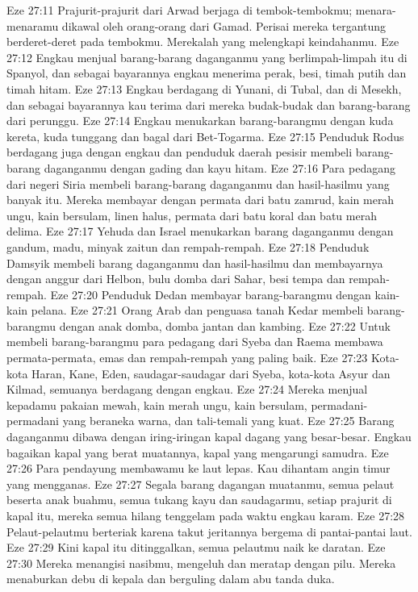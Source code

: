 Eze 27:11  Prajurit-prajurit dari Arwad berjaga di tembok-tembokmu; menara-menaramu dikawal oleh orang-orang dari Gamad. Perisai mereka tergantung berderet-deret pada tembokmu. Merekalah yang melengkapi keindahanmu.
Eze 27:12  Engkau menjual barang-barang daganganmu yang berlimpah-limpah itu di Spanyol, dan sebagai bayarannya engkau menerima perak, besi, timah putih dan timah hitam.
Eze 27:13  Engkau berdagang di Yunani, di Tubal, dan di Mesekh, dan sebagai bayarannya kau terima dari mereka budak-budak dan barang-barang dari perunggu.
Eze 27:14  Engkau menukarkan barang-barangmu dengan kuda kereta, kuda tunggang dan bagal dari Bet-Togarma.
Eze 27:15  Penduduk Rodus berdagang juga dengan engkau dan penduduk daerah pesisir membeli barang-barang daganganmu dengan gading dan kayu hitam.
Eze 27:16  Para pedagang dari negeri Siria membeli barang-barang daganganmu dan hasil-hasilmu yang banyak itu. Mereka membayar dengan permata dari batu zamrud, kain merah ungu, kain bersulam, linen halus, permata dari batu koral dan batu merah delima.
Eze 27:17  Yehuda dan Israel menukarkan barang daganganmu dengan gandum, madu, minyak zaitun dan rempah-rempah.
Eze 27:18  Penduduk Damsyik membeli barang daganganmu dan hasil-hasilmu dan membayarnya dengan anggur dari Helbon, bulu domba dari Sahar, besi tempa dan rempah-rempah.
Eze 27:20  Penduduk Dedan membayar barang-barangmu dengan kain-kain pelana.
Eze 27:21  Orang Arab dan penguasa tanah Kedar membeli barang-barangmu dengan anak domba, domba jantan dan kambing.
Eze 27:22  Untuk membeli barang-barangmu para pedagang dari Syeba dan Raema membawa permata-permata, emas dan rempah-rempah yang paling baik.
Eze 27:23  Kota-kota Haran, Kane, Eden, saudagar-saudagar dari Syeba, kota-kota Asyur dan Kilmad, semuanya berdagang dengan engkau.
Eze 27:24  Mereka menjual kepadamu pakaian mewah, kain merah ungu, kain bersulam, permadani-permadani yang beraneka warna, dan tali-temali yang kuat.
Eze 27:25  Barang daganganmu dibawa dengan iring-iringan kapal dagang yang besar-besar. Engkau bagaikan kapal yang berat muatannya, kapal yang mengarungi samudra.
Eze 27:26  Para pendayung membawamu ke laut lepas. Kau dihantam angin timur yang mengganas.
Eze 27:27  Segala barang dagangan muatanmu, semua pelaut beserta anak buahmu, semua tukang kayu dan saudagarmu, setiap prajurit di kapal itu, mereka semua hilang tenggelam pada waktu engkau karam.
Eze 27:28  Pelaut-pelautmu berteriak karena takut jeritannya bergema di pantai-pantai laut.
Eze 27:29  Kini kapal itu ditinggalkan, semua pelautmu naik ke daratan.
Eze 27:30  Mereka menangisi nasibmu, mengeluh dan meratap dengan pilu. Mereka menaburkan debu di kepala dan berguling dalam abu tanda duka.
